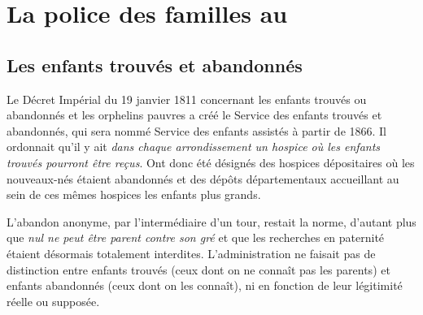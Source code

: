 


\chapter{La police des familles au }


\section{Les enfants trouvés et abandonnés}

 Le Décret Impérial du 19 janvier 1811 concernant les enfants trouvés ou abandonnés et les orphelins pauvres a créé le Service des enfants trouvés et abandonnés, qui sera nommé Service des enfants assistés à partir de 1866. Il ordonnait qu'il y ait \emph{dans chaque arrondissement un hospice où les enfants trouvés pourront être reçus}. Ont donc été désignés des hospices dépositaires où les nouveaux-nés étaient abandonnés et des dépôts départementaux accueillant au sein de ces mêmes hospices les enfants plus grands. 

 L'abandon anonyme, par l'intermédiaire d'un tour, restait la norme, d'autant plus que \emph{nul ne peut être parent contre son gré} et que les recherches en paternité étaient désormais totalement interdites. L'administration ne faisait pas de distinction entre enfants trouvés (ceux dont on ne connaît pas les parents) et enfants abandonnés (ceux dont on les connaît), ni en fonction de leur légitimité réelle ou supposée.

